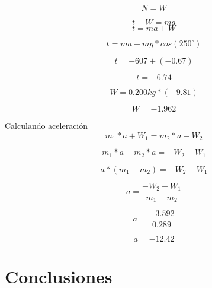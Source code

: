 \documentclass{article}
\begin{document}
\begin{multicols}{2}

\begin{equation*}
	N = W 
\end{equation*}


\begin{equation*}
	t - W = ma	
\end{equation*}
\begin{equation*}
	t = ma + W
\end{equation*}

\begin{equation*}
t = ma + mg * cos(250^\circ)
\end{equation*}

\begin{equation*}
t = -607 + (-0.67)
\end{equation*}

\begin{equation*}
t= -6.74
\end{equation*}

\begin{equation*}
W = 0.200kg * (-9.81)
\end{equation*}

\begin{equation*}
W = -1.962 
\end{equation*}

Calculando aceleración
\begin{equation*}
	m_1 * a + W_1 = m_2 * a - W_2
\end{equation*}

\begin{equation*}
	m_1 * a - m_2 * a = -W_2 - W_1
\end{equation*}

\begin{equation*}
	a * (m_1 - m_2) = -W_2 - W_1
\end{equation*}

\begin{equation*}
	a = \frac{-W_2 - W_1}{m_1 - m_2}
\end{equation*}

\begin{equation*}
a = \frac{-3.592}{0.289}
\end{equation*}

\begin{equation*}
	a = -12.42
\end{equation*}


\section{Conclusiones}\label{Conclusiones}				%


\end{multicols}
\end{document}
